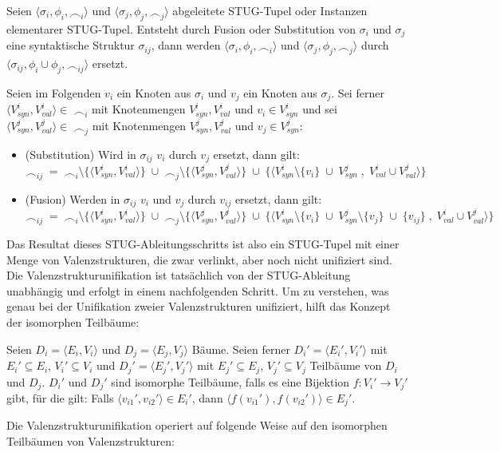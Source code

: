 \begin{definition}
Seien $\langle \sigma_i, \phi_i, \frown_i \rangle$ und $\langle \sigma_j, \phi_j, \frown_j \rangle$ abgeleitete STUG-Tupel oder Instanzen elementarer STUG-Tupel. Entsteht durch Fusion oder Substitution von $\sigma_i$ und $\sigma_j$ eine syntaktische Struktur $\sigma_{ij}$, dann werden $\langle \sigma_i, \phi_i, \frown_i \rangle$ und $\langle \sigma_j, \phi_j, \frown_j \rangle$ durch $\langle \sigma_{ij}, \phi_i \cup \phi_j, \frown_{ij} \rangle$ ersetzt. 

Seien im Folgenden $v_i$ ein Knoten aus $\sigma_i$ und $v_j$ ein Knoten aus $\sigma_j$. Sei ferner $\langle V_{syn}^i, V_{val}^i \rangle \in \; \frown_i$ mit Knotenmengen $V_{syn}^i, V_{val}^i$ und $v_i \in V_{syn}^i$ und sei $\langle V_{syn}^j, V_{val}^j \rangle \in \; \frown_j$ mit Knotenmengen $V_{syn}^j, V_{val}^j$ und $v_j \in V_{syn}^j$:

\begin{itemize}
\item (Substitution) Wird in $\sigma_{ij}$ $v_i$ durch $v_j$ ersetzt, dann gilt: \\
$\frown_{ij} \; = \; \frown_i \setminus \{\langle V_{syn}^i, V_{val}^i \rangle\} \; \cup \;\frown_j \setminus \{\langle V_{syn}^j, V_{val}^j \rangle\} \; \cup \; \{\langle V_{syn}^i \setminus \{v_i\} \; \cup \; V_{syn}^j \; , \; V_{val}^i \cup V_{val}^j \rangle\}$
\item (Fusion) Werden in $\sigma_{ij}$ $v_i$ und $v_j$ durch $v_{ij}$ ersetzt, dann gilt: \\
$\frown_{ij} \; = \; \frown_i \setminus \{\langle V_{syn}^i, V_{val}^i \rangle\} \; \cup \; \frown_j \setminus \{\langle V_{syn}^j, V_{val}^j \rangle\} \; \cup \; \{\langle V_{syn}^i \setminus \{v_i\} \; \cup \; V_{syn}^j \setminus \{v_j\} \; \cup \; \{v_{ij}\} \; , \; V_{val}^i \cup V_{val}^j \rangle\}$
\end{itemize} 

\end{definition}   
Das Resultat dieses STUG-Ableitungsschritts ist also ein STUG-Tupel mit einer Menge von Valenzstrukturen, die zwar verlinkt, aber noch nicht unifiziert sind. Die Valenzstrukturunifikation ist tatsächlich von der STUG-Ableitung unabhängig und erfolgt in einem nachfolgenden Schritt. Um zu verstehen, was genau bei der Unifikation zweier Valenzstrukturen unifiziert, hilft das Konzept der isomorphen Teilbäume:  

\begin{definition}
Seien $D_i = \langle E_i,V_i \rangle$ und $D_j = \langle E_j,V_j \rangle$ Bäume.
Seien ferner $D_i' = \langle E_i', V_i' \rangle$ mit $E_i' \subseteq E_i$, $V_i' \subseteq V_i$ und $D_j' = \langle E_j', V_j' \rangle$ mit $E_j' \subseteq E_j$, $V_j' \subseteq V_j$ Teilbäume von $D_i$ und $D_j$. $D_i'$ und $D_j'$ sind isomorphe Teilbäume, falls es eine Bijektion $f:V_i' \to V_j'$ gibt, für die gilt: Falls $\langle v_{i1}', v_{i2}' \rangle \in E_i'$, dann $\langle f(v_{i1}'), f(v_{i2}') \rangle \in E_j'$.
\end{definition}
Die Valenzstrukturunifikation operiert auf folgende Weise auf den isomorphen Teilbäumen von Valenzstrukturen:

